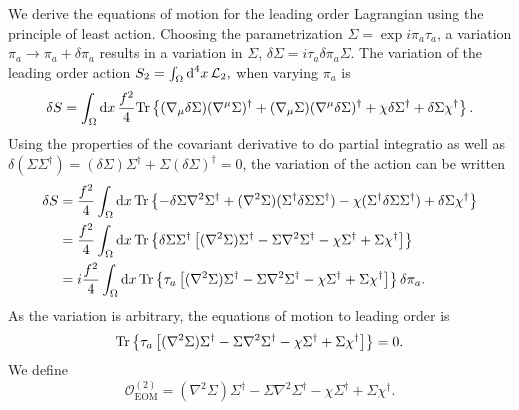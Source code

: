 We derive the equations of motion for the leading order Lagrangian using the principle of least action.
Choosing the parametrization $\Sigma = \exp{i \pi_a \tau_a}$, a variation $\pi_a \rightarrow \pi_a + \delta \pi_a$ results in a variation in $\Sigma$, $\delta \Sigma = i \tau_a \delta \pi_a \Sigma $.
The variation of the leading order action
$
    S_2 = \int_\Omega \text{d}^4x \, \mathcal{L}_2,
$
when varying $\pi_a$ is 
%
\begin{align*}
    \delta S = \int_\Omega \text{d} x \, \frac{f^2}{4}
    \text{Tr} \left\{ 
        (\nabla_\mu \delta \Sigma) (\nabla^\mu \Sigma)^\dagger
        + (\nabla_\mu \Sigma) (\nabla^\mu \delta \Sigma)^\dagger
        + \chi \delta \Sigma^\dagger + \delta \Sigma \chi^\dagger
     \right\}.
\end{align*}
%
Using the properties of the covariant derivative to do partial integratio as well as $\delta(\Sigma \Sigma^\dagger) = (\delta\Sigma)\Sigma^\dagger + \Sigma (\delta \Sigma)^\dagger = 0$, the variation of the action can be written
%
\begin{align*}
    \delta S 
    & = \frac{f^2}{4} \int_\Omega \text{d} x\, 
    \text{Tr} \left\{ 
        - \delta \Sigma \nabla^2 \Sigma^\dagger
        + (\nabla^2 \Sigma) (\Sigma^\dagger \delta \Sigma \Sigma^\dagger)
        - \chi (\Sigma^\dagger \delta \Sigma \Sigma^\dagger)
        + \delta \Sigma \chi^\dagger
     \right\} \\
    & = 
    \frac{f^2}{4} \int_\Omega \text{d} x\, 
    \text{Tr} \left\{ 
        \delta \Sigma \Sigma^\dagger 
        \left[
            (\nabla^2 \Sigma)\Sigma^\dagger
            - \Sigma \nabla^2 \Sigma^\dagger
            - \chi \Sigma^\dagger
            + \Sigma \chi^\dagger
        \right]
         \right\} \\
    & = 
    i \frac{f^2}{4} \int_\Omega \text{d} x\, 
    \text{Tr} \left\{ \tau_a 
    \left[
         (\nabla^2 \Sigma)\Sigma^\dagger
        - \Sigma \nabla^2 \Sigma^\dagger
        - \chi \Sigma^\dagger
        + \Sigma \chi^\dagger
    \right]
     \right\} 
    \delta \pi_a.
\end{align*}
%
%
As the variation is arbitrary, the equations of motion to leading order is
%
\begin{equation}
    \text{Tr} \left\{ 
        \tau_a 
        \left[
            (\nabla^2 \Sigma)\Sigma^\dagger
            - \Sigma \nabla^2 \Sigma^\dagger
            - \chi \Sigma^\dagger
            + \Sigma \chi^\dagger
        \right]
     \right\} = 0.
\end{equation}
%
We define
%
\begin{equation}
    \mathcal O_\text{EOM}^{(2)}
    = 
    (\nabla^2 \Sigma)\Sigma^\dagger
    - \Sigma \nabla^2 \Sigma^\dagger
    - \chi \Sigma^\dagger
    + \Sigma \chi^\dagger.
\end{equation}


